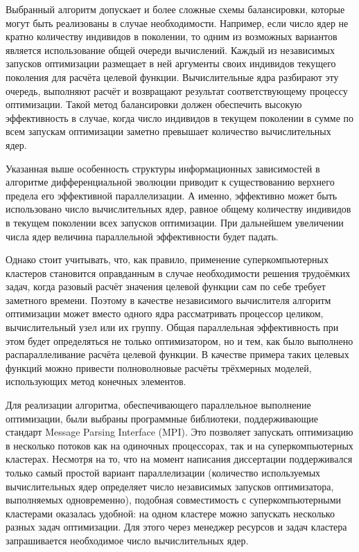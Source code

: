 Выбранный алгоритм допускает и более сложные схемы балансировки,
которые могут быть реализованы в случае необходимости. Например, если
число ядер не кратно количеству индивидов в поколении, то одним из
возможных вариантов является использование общей очереди
вычислений. Каждый из независимых запусков оптимизации размещает в ней
аргументы своих индивидов текущего поколения для расчёта целевой
функции.  Вычислительные ядра разбирают эту очередь, выполняют расчёт
и возвращают результат соответствующему процессу оптимизации. Такой
метод балансировки должен обеспечить высокую эффективность в случае,
когда число индивидов в текущем поколении в сумме по всем запускам
оптимизации заметно превышает количество вычислительных ядер.

Указанная выше особенность структуры информационных зависимостей в
алгоритме дифференциальной эволюции приводит к существованию верхнего
предела его эффективной параллелизации.  А именно, эффективно может
быть использовано число вычислительных ядер, равное общему количеству
индивидов в текущем поколении всех запусков оптимизации. При
дальнейшем увеличении числа ядер величина параллельной эффективности
будет падать.

Однако стоит учитывать, что, как правило, применение суперкомпьютерных
кластеров становится оправданным в случае необходимости решения
трудоёмких задач, когда разовый расчёт значения целевой функции сам по
себе требует заметного времени. Поэтому в качестве независимого
вычислителя алгоритм оптимизации может вместо одного ядра
рассматривать процессор целиком, вычислительный узел или их
группу. Общая параллельная эффективность при этом будет определяться
не только оптимизатором, но и тем, как было выполнено
распараллеливание расчёта целевой функции.  В качестве примера таких
целевых функций можно привести полноволновые расчёты трёхмерных
моделей, использующих метод конечных элементов.

Для реализации алгоритма, обеспечивающего параллельное выполнение
оптимизации, были выбраны программные библиотеки, поддерживающие
стандарт Message Parsing Interface (MPI). Это позволяет запускать
оптимизацию в несколько потоков как на одиночных процессорах, так и на
суперкомпьютерных кластерах. Несмотря на то, что на момент написания
диссертации поддерживался только самый простой вариант параллелизации
(количество используемых вычислительных ядер определяет число
независимых запусков оптимизатора, выполняемых одновременно), подобная
совместимость с суперкомпьютерными кластерами оказалась удобной: на
одном кластере можно запускать несколько разных задач оптимизации. 
Для этого через менеджер ресурсов и
задач кластера запрашивается необходимое число вычислительных ядер.

